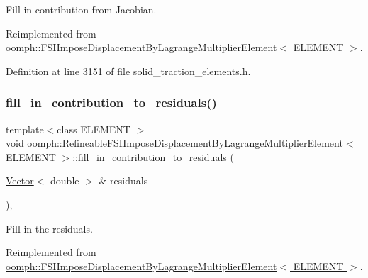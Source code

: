 Fill in contribution from Jacobian. 



Reimplemented from \hyperlink{classoomph_1_1FSIImposeDisplacementByLagrangeMultiplierElement_a48006d22e0ad79703914c687390150b8}{oomph\+::\+F\+S\+I\+Impose\+Displacement\+By\+Lagrange\+Multiplier\+Element$<$ E\+L\+E\+M\+E\+N\+T $>$}.



Definition at line 3151 of file solid\+\_\+traction\+\_\+elements.\+h.

\mbox{\label{classoomph_1_1RefineableFSIImposeDisplacementByLagrangeMultiplierElement_aa4b78afa54ddb638bfc9428b2b6fe860}} 
\subsubsection{\texorpdfstring{fill\+\_\+in\+\_\+contribution\+\_\+to\+\_\+residuals()}{fill\_in\_contribution\_to\_residuals()}}
{\footnotesize\ttfamily template$<$class E\+L\+E\+M\+E\+NT $>$ \\
void \hyperlink{classoomph_1_1RefineableFSIImposeDisplacementByLagrangeMultiplierElement}{oomph\+::\+Refineable\+F\+S\+I\+Impose\+Displacement\+By\+Lagrange\+Multiplier\+Element}$<$ E\+L\+E\+M\+E\+NT $>$\+::fill\+\_\+in\+\_\+contribution\+\_\+to\+\_\+residuals (\begin{DoxyParamCaption}\item[{\hyperlink{classoomph_1_1Vector}{Vector}$<$ double $>$ \&}]{residuals }\end{DoxyParamCaption})\hspace{0.3cm}{\ttfamily [inline]}, {\ttfamily [virtual]}}



Fill in the residuals. 



Reimplemented from \hyperlink{classoomph_1_1FSIImposeDisplacementByLagrangeMultiplierElement_aadea4a492cc464dae2c77617a706a98d}{oomph\+::\+F\+S\+I\+Impose\+Displacement\+By\+Lagrange\+Multiplier\+Element$<$ E\+L\+E\+M\+E\+N\+T $>$}.



